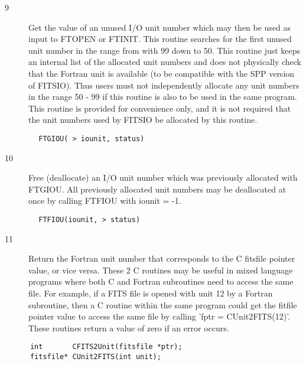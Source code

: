 \documentclass[11pt]{book}
\begin{document}
\begin{description}
\item[9 ] Get the value of an unused I/O unit number which may then be used
    as input to FTOPEN or FTINIT.  This routine searches for the first
    unused unit number in the range from with 99 down to 50.   This
    routine just keeps an internal list of the allocated unit numbers
    and does not physically check that the Fortran unit is available (to be
    compatible with the SPP version of FITSIO).  Thus users must not
    independently allocate any unit numbers in the range 50 - 99
    if this routine is also to be used in the same program.  This
    routine is provided for convenience only, and it is not required
   that the unit numbers used by FITSIO be allocated by this routine.
\end{description}

\begin{verbatim}
        FTGIOU( > iounit, status)
\end{verbatim}

\begin{description}
\item[10]  Free (deallocate) an I/O unit number which was previously allocated
    with FTGIOU.   All previously allocated unit numbers may be
   deallocated at once by calling FTFIOU with iounit = -1.
\end{description}

\begin{verbatim}
        FTFIOU(iounit, > status)
\end{verbatim}

\begin{description}
\item[11]  Return the Fortran unit number that corresponds to the C fitsfile
pointer value, or vice versa.  These 2 C routines may be useful in
mixed language programs where both C and Fortran subroutines need
to access the same file.  For example, if a FITS file is opened
with unit 12 by a Fortran subroutine, then a C routine within the
same program could get the fitfile pointer value to access the same file
by calling  'fptr = CUnit2FITS(12)'.  These routines return a value
of zero if an error occurs.
\end{description}

\begin{verbatim}
      int       CFITS2Unit(fitsfile *ptr);
      fitsfile* CUnit2FITS(int unit);
\end{verbatim}
\end{document}
